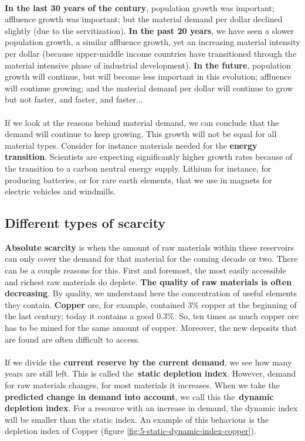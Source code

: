 \documentclass[../summary.tex]{subfiles}
\begin{document}
	\ \\
	\textbf{In the last 30 years of the  century}, population growth was important; affluence growth was important; but the material demand per dollar declined slightly (due to the servitization). \textbf{In the past 20 years}, we have seen a slower population growth, a similar affluence growth, yet an increasing material intensity per dollar (because upper-middle income countries have transitioned through the material intensive phase of industrial development). \textbf{In the future}, population growth will continue, but will become less important in this evolution; affluence will continue growing; and the material demand per dollar will continue to grow but not faster, and faster, and faster...
	\\
	\\
	If we look at the reasons behind material demand, we can conclude that the demand will continue to keep growing. This growth will not be equal for all material types. Consider for instance materials needed for the \textbf{energy transition}. Scientists are expecting significantly higher growth rates because of the transition to a carbon neutral energy supply. Lithium for instance, for producing batteries, or for rare earth elements, that we use in magnets for electric vehicles and windmills.
	
	\subsection{Different types of scarcity}
	
	\textbf{Absolute scarcity} is when the amount of raw materials within these reservoirs can only cover the demand for that material for the coming decade or two. There can be a couple reasons for this. First and foremost, the most easily accessible and richest raw materials do deplete. \textbf{The quality of raw materials is often decreasing}. By quality, we understand here the concentration of useful elements they contain. \textbf{Copper} ore, for example, contained 3\% copper at the beginning of the last century; today it contains a good 0.3\%. So, ten times as much copper ore has to be mined for the same amount of copper. Moreover, the new deposits that are found are often difficult to access.
	\\\\
	If we divide the \textbf{current reserve by the current demand}, we see how many years are still left. This is called the \textbf{static depletion index}. However, demand for raw materials changes, for most materials it increases. When we take the \textbf{predicted change in demand into account}, we call this the \textbf{dynamic depletion index}. For a resource with an increase in demand, the dynamic index will be smaller than the static index. An example of this behaviour is the depletion index of Copper (figure \ref{fig:5-static-dynamic-index-copper}).
	
\end{document}
